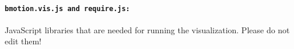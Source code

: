 \paragraph{\texttt{bmotion.vis.js and require.js:}}
JavaScript libraries that are needed for running the visualization.
Please do not edit them!

%

